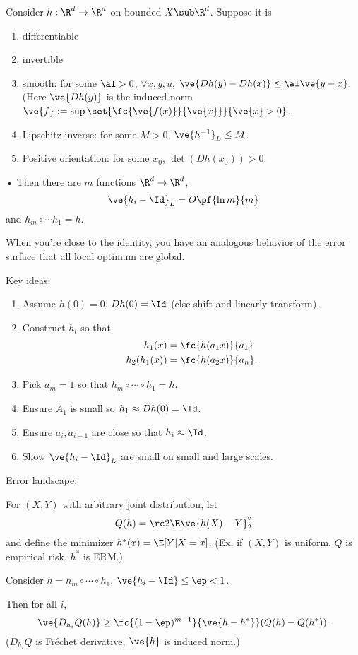\begin{thm}
Consider $h:\R^d\to \R^d$ on bounded $X\sub \R^d$. Suppose it is 
\begin{enumerate}
\item
differentiable
\item
invertible
\item
smooth: for some $\al>0$, $\forall x,y,u$, $\ve{Dh(y)-Dh(x)}\le \al \ve{y-x}$.  (Here $\ve{Dh(y)}$ is the induced norm $\ve{f}:=\sup \set{\fc{\ve{f(x)}}{\ve{x}}}{\ve{x}>0}$.
\item
Lipschitz inverse: for some $M>0$, $\ve{h^{-1}}_L\le M$.
\item
Positive orientation: for some $x_0$, $\det(Dh(x_0))>0$.
\end{enumerate}•
Then there are $m$ functions $\R^d\to \R^d$, 
$$
\ve{h_i-\Id}_L = O\pf{\ln m}{m}
$$
and $h_m\circ\cdots h_1=h$.
\end{thm}
When you're close to the identity, you have an analogous behavior of the error surface that all local optimum are global.


Key ideas:
\begin{enumerate}
\item
Assume $h(0)=0$, $Dh(0)=\Id$ (else shift and linearly transform).
\item
Construct $h_i$ so that 
\begin{align}h_1(x) &= \fc{h(a_1x)}{a_1}\\
h_2(h_1(x)) &= \fc{h(a_2x)}{a_n}.
\end{align}
\item
Pick $a_m=1$ so that $h_m\circ \cdots  \circ h_1=h$.
\item
Ensure $A_1$ is small so $h_1\approx Dh(0)=\Id$.
\item
Ensure $a_i,a_{i+1}$ are close so that $h_i\approx \Id$.
\item
Show $\ve{h_i-\Id}_L$ are small on small and large scales.
\end{enumerate}

Error landscape: 
\begin{thm}
For $(X,Y)$ with arbitrary joint distribution, let
$$
Q(h) = \rc 2 \E\ve{h(X)-Y}_2^2
$$
and define the minimizer $h^*(x) = \E[Y|X=x]$. (Ex. if $(X,Y)$ is uniform, $Q$ is empirical risk, $h^*$ is ERM.)

Consider $h=h_m\circ \cdots \circ h_1$, $\ve{h_i-\Id}\le \ep<1$.

Then for all $i$,
$$
\ve{D_{h_i} Q(h)} \ge \fc{(1-\ep)^{m-1}}{\ve{h-h^*}} (Q(h)-Q(h^*)).
$$
($D_{h_i}Q$ is Fr\'echet derivative, $\ve{h}$ is induced norm.)
\end{thm}

